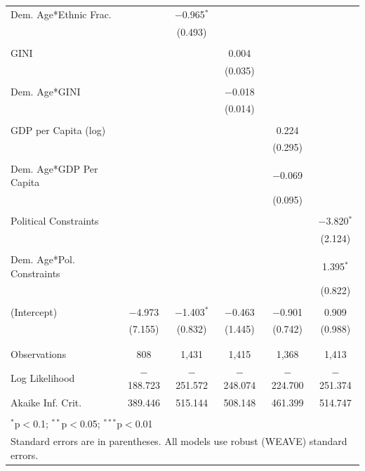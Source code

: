 \documentclass[a4paper]{article}\usepackage[]{graphicx}\usepackage[]{color}
\begin{document}
\begin{table}
\begin{center}
{\begin{tabular}{@{\extracolsep{5pt}}lccccc}
 Dem. Age*Ethnic Frac. &  & $-$0.965$^{*}$ &  &  &  \\ 
  &  & (0.493) &  &  &  \\ 
  & & & & & \\ 
 GINI &  &  & 0.004 &  &  \\ 
  &  &  & (0.035) &  &  \\ 
  & & & & & \\ 
 Dem. Age*GINI &  &  & $-$0.018 &  &  \\ 
  &  &  & (0.014) &  &  \\ 
  & & & & & \\ 
 GDP per Capita (log) &  &  &  & 0.224 &  \\ 
  &  &  &  & (0.295) &  \\ 
  & & & & & \\ 
 Dem. Age*GDP Per Capita &  &  &  & $-$0.069 &  \\ 
  &  &  &  & (0.095) &  \\ 
  & & & & & \\ 
 Political Constraints &  &  &  &  & $-$3.820$^{*}$ \\ 
  &  &  &  &  & (2.124) \\ 
  & & & & & \\ 
 Dem. Age*Pol. Constraints &  &  &  &  & 1.395$^{*}$ \\ 
  &  &  &  &  & (0.822) \\ 
  & & & & & \\ 
 (Intercept) & $-$4.973 & $-$1.403$^{*}$ & $-$0.463 & $-$0.901 & 0.909 \\ 
  & (7.155) & (0.832) & (1.445) & (0.742) & (0.988) \\ 
  & & & & & \\ 
\hline \\[-1.8ex] 
Observations & 808 & 1,431 & 1,415 & 1,368 & 1,413 \\ 
Log Likelihood & $-$188.723 & $-$251.572 & $-$248.074 & $-$224.700 & $-$251.374 \\ 
Akaike Inf. Crit. & 389.446 & 515.144 & 508.148 & 461.399 & 514.747 \\ 
\hline 
\hline \\[-1.8ex] 
\multicolumn{6}{l}{$^{*}$p$<$0.1; $^{**}$p$<$0.05; $^{***}$p$<$0.01} \\ 
\multicolumn{6}{l}{Standard errors are in parentheses. All models use robust (WEAVE) standard errors.} \\ 
\end{tabular} 

    }
    \end{center}
\end{table}
\end{document}
